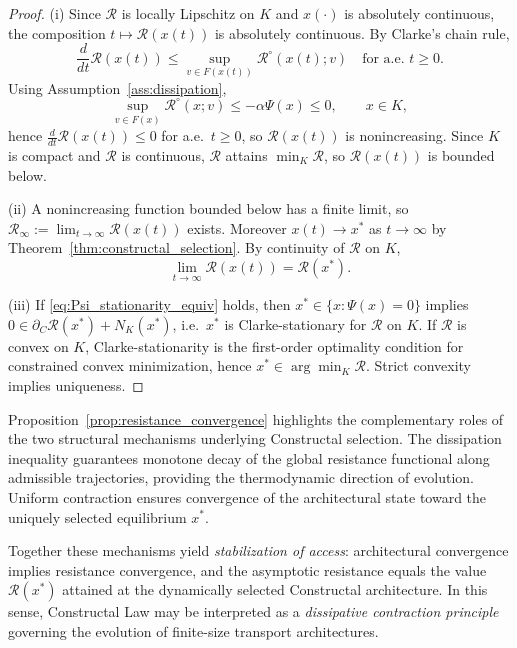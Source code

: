\documentclass[12pt]{article}
\theoremstyle{plain}
\theoremstyle{definition}
\theoremstyle{remark}
\begin{document}
\begin{proof}
(i) Since $\mathcal R$ is locally Lipschitz on $K$ and $x(\cdot)$ is absolutely continuous,
the composition $t\mapsto \mathcal R(x(t))$ is absolutely continuous.
By Clarke’s chain rule,
\[
\frac{d}{dt}\mathcal R(x(t))
\le
\sup_{v\in F(x(t))}\mathcal R^\circ(x(t);v)
\quad \text{for a.e. } t\ge0.
\]
Using Assumption~\ref{ass:dissipation},
\[
\sup_{v\in F(x)}\mathcal R^\circ(x;v)\le -\alpha\Psi(x)\le 0,
\qquad x\in K,
\]
hence $\frac{d}{dt}\mathcal R(x(t))\le 0$ for a.e.\ $t\ge0$, so $\mathcal R(x(t))$ is nonincreasing.
Since $K$ is compact and $\mathcal R$ is continuous, $\mathcal R$ attains $\min_K \mathcal R$,
so $\mathcal R(x(t))$ is bounded below.

(ii) A nonincreasing function bounded below has a finite limit, so
$\mathcal R_\infty:=\lim_{t\to\infty}\mathcal R(x(t))$ exists.
Moreover $x(t)\to x^\ast$ as $t\to\infty$ by Theorem~\ref{thm:constructal_selection}.
By continuity of $\mathcal R$ on $K$,
\[
\lim_{t\to\infty}\mathcal R(x(t))=\mathcal R(x^\ast).
\]

(iii) If \eqref{eq:Psi_stationarity_equiv} holds, then $x^\ast\in\{x:\Psi(x)=0\}$ implies
$0\in \partial_C \mathcal R(x^\ast)+N_K(x^\ast)$, i.e.\ $x^\ast$ is Clarke-stationary
for $\mathcal R$ on $K$. If $\mathcal R$ is convex on $K$, Clarke-stationarity is the
first-order optimality condition for constrained convex minimization, hence $x^\ast\in\arg\min_K\mathcal R$.
Strict convexity implies uniqueness.
\end{proof}


\medskip

Proposition~\ref{prop:resistance_convergence} highlights the
complementary roles of the two structural mechanisms underlying
Constructal selection.
The dissipation inequality guarantees monotone decay of the global
resistance functional along admissible trajectories, providing the
thermodynamic direction of evolution.
Uniform contraction ensures convergence of the architectural state
toward the uniquely selected equilibrium $x^\ast$.

Together these mechanisms yield \emph{stabilization of access}:
architectural convergence implies resistance convergence, and the
asymptotic resistance equals the value $\mathcal R(x^\ast)$ attained at
the dynamically selected Constructal architecture.
In this sense, Constructal Law may be interpreted as a
\emph{dissipative contraction principle} governing the evolution of
finite-size transport architectures.
\end{document}
